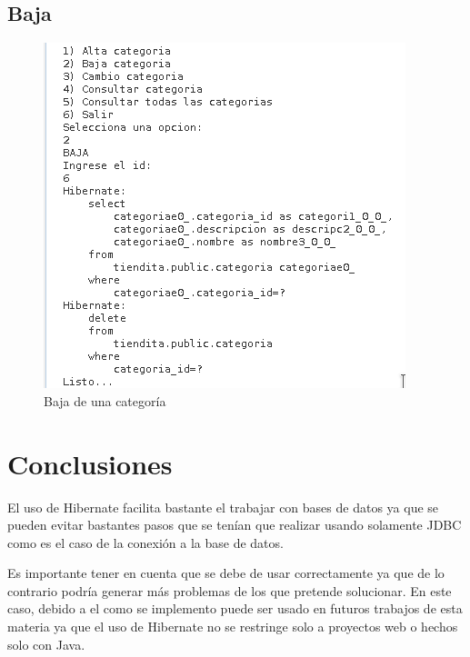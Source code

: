 \documentclass[a4paper,12pt]{article}
\begin{document}
\subsection{Baja}
\begin{figure}[H]
\begin{center}
 \includegraphics[width=\textwidth]{baja.png}
 \caption{Baja de una categoría}
 \label{fig:alta}
\end{center}
\end{figure}

\section{Conclusiones}
El uso de Hibernate facilita bastante el trabajar con bases de datos ya que se 
pueden evitar bastantes pasos que se tenían que realizar usando solamente JDBC 
como es el caso de la conexión a la base de datos.

Es importante tener en cuenta que se debe de usar correctamente ya que de lo 
contrario podría generar más problemas de los que pretende solucionar. En este 
caso, debido a el como se implemento puede ser usado en futuros trabajos de 
esta materia ya que el uso de Hibernate no se restringe solo a proyectos web o 
hechos solo con Java.
\end{document}
